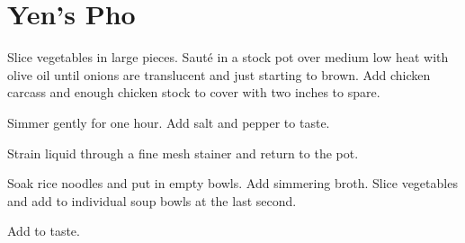 \section{Yen's Pho}
\begin{recipe}


Slice vegetables in large pieces. Sauté in a stock pot over medium low heat with olive oil until onions are translucent and just starting to brown. Add chicken carcass and enough chicken stock to cover with two inches to spare.

Simmer gently for one hour. Add salt and pepper to taste.

Strain liquid through a fine mesh stainer and return to the pot.


Soak rice noodles and put in empty bowls. Add simmering broth. Slice vegetables and add to individual soup bowls at the last second.


Add to taste.


\end{recipe}
